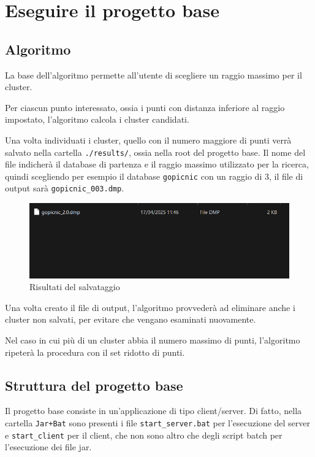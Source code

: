 \section{Eseguire il progetto base}

\subsection{Algoritmo}

La base dell'algoritmo permette all'utente di scegliere un raggio massimo per il cluster. 

Per ciascun punto interessato, ossia i punti con distanza inferiore al raggio impostato, l'algoritmo calcola i cluster candidati.

Una volta individuati i cluster, quello con il numero maggiore di punti verrà salvato nella cartella \texttt{./results/}, ossia nella root del progetto base. Il nome del file indicherà il database di partenza e il raggio massimo utilizzato per la ricerca, quindi scegliendo per esempio il database \texttt{gopicnic} con un raggio di 3, il file di output sarà \texttt{gopicnic\_003.dmp}.

\begin{figure}[h!]
    \centering
    \includegraphics[width = 0.5 \textwidth]{images/results.png}
    \caption{Risultati del salvataggio}
    
\end{figure}

Una volta creato il file di output, l'algoritmo provvederà ad eliminare anche i cluster non salvati, per evitare che vengano esaminati nuovamente. 

Nel caso in cui più di un cluster abbia il numero massimo di punti, l'algoritmo ripeterà la procedura con il set ridotto di punti. 

\subsection{Struttura del progetto base}

Il progetto base consiste in un'applicazione di tipo client/server. Di fatto, nella cartella \texttt{Jar+Bat} sono presenti i file \texttt{start\_server.bat} per l'esecuzione del server e \texttt{start\_client} per il client, che non sono altro che degli script batch per l'esecuzione dei file jar.

